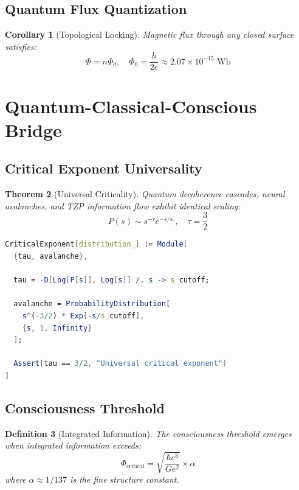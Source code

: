 \documentclass[11pt,a4paper]{article}
\newtheorem{theorem}{Theorem}
\newtheorem{definition}[theorem]{Definition}
\newtheorem{corollary}[theorem]{Corollary}
\begin{document}
\subsection{Quantum Flux Quantization}


\begin{corollary}[Topological Locking]
Magnetic flux through any closed surface satisfies:
\begin{equation}
\Phi = n\Phi_0, \quad \Phi_0 = \frac{h}{2e} \approx 2.07 \times 10^{-15} \text{ Wb}
\end{equation}
\end{corollary}


\section{Quantum-Classical-Conscious Bridge}


\subsection{Critical Exponent Universality}


\begin{theorem}[Universal Criticality]
Quantum decoherence cascades, neural avalanches, and TZP information flow exhibit identical scaling:
\begin{equation}
P(s) \sim s^{-\tau} e^{-s/s_c}, \quad \tau = \frac{3}{2}
\end{equation}
\end{theorem}


\begin{lstlisting}[language=Mathematica]
CriticalExponent[distribution_] := Module[
  {tau, avalanche},
  
  tau = -D[Log[P[s]], Log[s]] /. s -> s_cutoff;
  
  avalanche = ProbabilityDistribution[
    s^(-3/2) * Exp[-s/s_cutoff],
    {s, 1, Infinity}
  ];
  
  Assert[tau == 3/2, "Universal critical exponent"]
]
\end{lstlisting}


\subsection{Consciousness Threshold}


\begin{definition}[Integrated Information]
The consciousness threshold emerges when integrated information exceeds:
\begin{equation}
\Phi_{\text{critical}} = \sqrt{\frac{\hbar c^3}{Ge^2}} \times \alpha
\end{equation}
where $\alpha \approx 1/137$ is the fine structure constant.
\end{definition}
\end{document}
